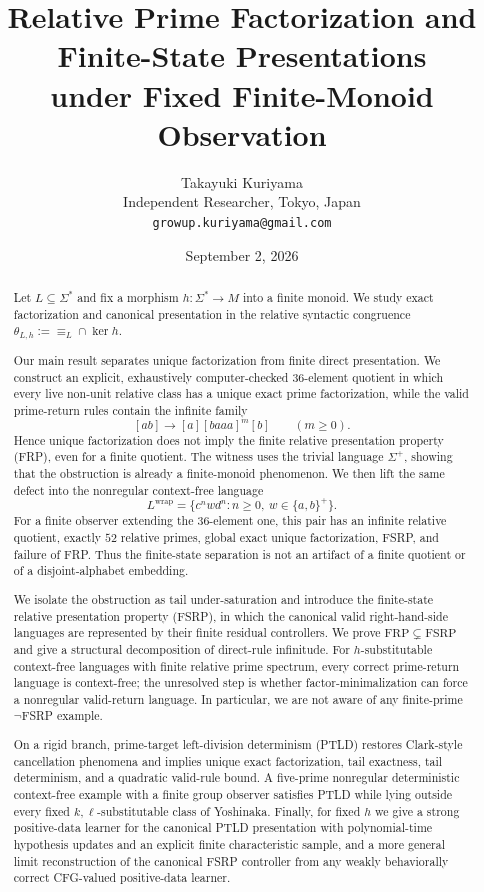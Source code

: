 \documentclass[11pt,a4paper]{article}
\title{Relative Prime Factorization and Finite-State Presentations\\under Fixed Finite-Monoid Observation}
\author{Takayuki Kuriyama\\
\small Independent Researcher, Tokyo, Japan\\
\small \texttt{growup.kuriyama@gmail.com}}
\date{September 2, 2026}
\begin{document}
\maketitle

\begin{abstract}
Let $L\subseteq\Sigma^*$ and fix a morphism $h:\Sigma^*\to M$ into a finite monoid.  We study exact factorization and canonical presentation in the relative syntactic congruence $\theta_{L,h}:=\equiv_L\cap\ker h$.

Our main result separates unique factorization from finite direct presentation.  We construct an explicit, exhaustively computer-checked $36$-element quotient in which every live non-unit relative class has a unique exact prime factorization, while the valid prime-return rules contain the infinite family
\[
  [ab]\to[a][baaa]^m[b]\qquad(m\ge0).
\]
Hence unique factorization does not imply the finite relative presentation property (FRP), even for a finite quotient.  The witness uses the trivial language $\Sigma^+$, showing that the obstruction is already a finite-monoid phenomenon.  We then lift the same defect into the nonregular context-free language
\[
  L^{\mathrm{wrap}}=\{c^nwd^n:n\ge0,\ w\in\{a,b\}^+\}.
\]
For a finite observer extending the $36$-element one, this pair has an infinite relative quotient, exactly $52$ relative primes, global exact unique factorization, FSRP, and failure of FRP.  Thus the finite-state separation is not an artifact of a finite quotient or of a disjoint-alphabet embedding.

We isolate the obstruction as tail under-saturation and introduce the finite-state relative presentation property (FSRP), in which the canonical valid right-hand-side languages are represented by their finite residual controllers.  We prove $\mathrm{FRP}\subsetneq\mathrm{FSRP}$ and give a structural decomposition of direct-rule infinitude.  For $h$-substitutable context-free languages with finite relative prime spectrum, every correct prime-return language is context-free; the unresolved step is whether factor-minimalization can force a nonregular valid-return language.  In particular, we are not aware of any finite-prime $\neg$FSRP example.

On a rigid branch, prime-target left-division determinism (PTLD) restores Clark-style cancellation phenomena and implies unique exact factorization, tail exactness, tail determinism, and a quadratic valid-rule bound.  A five-prime nonregular deterministic context-free example with a finite group observer satisfies PTLD while lying outside every fixed $k,\ell$-substitutable class of Yoshinaka.  Finally, for fixed $h$ we give a strong positive-data learner for the canonical PTLD presentation with polynomial-time hypothesis updates and an explicit finite characteristic sample, and a more general limit reconstruction of the canonical FSRP controller from any weakly behaviorally correct CFG-valued positive-data learner.
\end{abstract}
\end{document}
